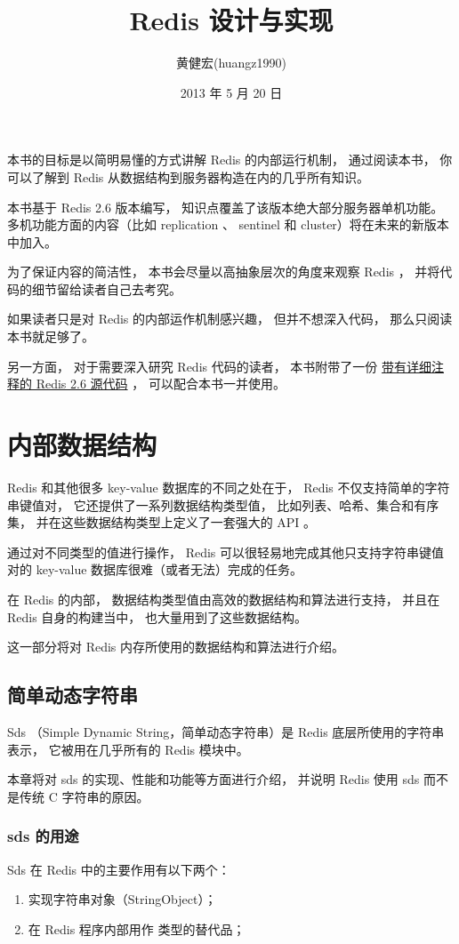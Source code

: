 \documentclass[a4paper,11pt,english]{sphinxmanual}
\title{Redis 设计与实现}
\date{2013 年 5 月 20 日}
\author{黄健宏(huangz1990)}
\begin{document}
\maketitle
\tableofcontents
{}\label{index::doc}


本书的目标是以简明易懂的方式讲解 Redis 的内部运行机制，
通过阅读本书，
你可以了解到 Redis 从数据结构到服务器构造在内的几乎所有知识。

本书基于 Redis 2.6 版本编写，
知识点覆盖了该版本绝大部分服务器单机功能。
多机功能方面的内容（比如 replication 、 sentinel 和 cluster）将在未来的新版本中加入。

为了保证内容的简洁性，
本书会尽量以高抽象层次的角度来观察 Redis ，
并将代码的细节留给读者自己去考究。

如果读者只是对 Redis 的内部运作机制感兴趣，
但并不想深入代码，
那么只阅读本书就足够了。

另一方面，
对于需要深入研究 Redis 代码的读者，
本书附带了一份 \href{https://github.com/huangz1990/annotated\_redis\_source}{带有详细注释的 Redis 2.6 源代码} ，
可以配合本书一并使用。


\chapter{内部数据结构}
\label{index:redis}\label{index:id1}
Redis 和其他很多 key-value 数据库的不同之处在于，
Redis 不仅支持简单的字符串键值对，
它还提供了一系列数据结构类型值，
比如列表、哈希、集合和有序集，
并在这些数据结构类型上定义了一套强大的 API 。

通过对不同类型的值进行操作，
Redis 可以很轻易地完成其他只支持字符串键值对的 key-value 数据库很难（或者无法）完成的任务。

在 Redis 的内部，
数据结构类型值由高效的数据结构和算法进行支持，
并且在 Redis 自身的构建当中，
也大量用到了这些数据结构。

这一部分将对 Redis 内存所使用的数据结构和算法进行介绍。


\section{简单动态字符串}
\label{internal-datastruct/sds::doc}\label{internal-datastruct/sds:id1}
Sds （Simple Dynamic String，简单动态字符串）是 Redis 底层所使用的字符串表示，
它被用在几乎所有的 Redis 模块中。

本章将对 sds 的实现、性能和功能等方面进行介绍，
并说明 Redis 使用 sds 而不是传统 C 字符串的原因。


\subsection{sds 的用途}
\label{internal-datastruct/sds:sds}
Sds 在 Redis 中的主要作用有以下两个：
\begin{enumerate}
\item {} 
实现字符串对象（StringObject）；

\item {} 
在 Redis 程序内部用作  类型的替代品；

\end{enumerate}
\end{document}

